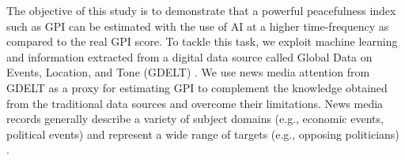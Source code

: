 \documentclass{bmcart}
\begin{document}



The objective of this study is to demonstrate that a powerful peacefulness index such as GPI \cite{gpi_site} can be estimated with the use of AI at a higher time-frequency as compared to the real GPI score.
To tackle this task, we exploit machine learning and information extracted from a digital data source called Global Data on Events, Location, and Tone (GDELT) \cite{gdelt_site}. 
We use news media attention from GDELT as a proxy for estimating GPI to complement the knowledge obtained from the traditional data sources and overcome their limitations. 
News media records generally describe a variety of subject domains (e.g., economic events, political events) and represent a wide range of targets (e.g., opposing politicians) \cite{balahur2013sentiment}.
\end{document}
